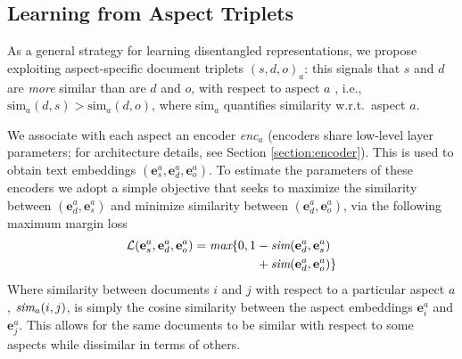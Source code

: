 \documentclass[11pt,a4paper]{article}
\begin{document}
\vspace{-.3em}
\subsection{Learning from Aspect Triplets}
\vspace{-.3em}

As a general strategy for learning disentangled representations, we propose exploiting aspect-specific document triplets $(s,d,o)_a$: this signals that $s$ and $d$ are \emph{more} similar than are $d$ and $o$, with respect to aspect $a$ \cite{karaletsos2015bayesian,veit2016conditional}, i.e., $\text{sim}_a (d, s) > \text{sim}_a (d, o)$, where sim$_a$ quantifies similarity w.r.t.~aspect $a$. 



We associate with each aspect an encoder \emph{enc}$_a$ (encoders share low-level layer parameters; for architecture details, see Section \ref{section:encoder}). This is used to obtain text embeddings $(\mathbf{e}^a_s, \mathbf{e}^a_d, \mathbf{e}^a_o)$. To estimate the parameters of these encoders we adopt a simple objective that seeks to maximize the similarity between $(\mathbf{e}^a_d, \mathbf{e}^a_s)$ and minimize similarity between $(\mathbf{e}^a_d, \mathbf{e}^a_o)$, via the following maximum margin loss%
\vspace{-.2em}
\begin{equation}
\begin{aligned}
\mathcal{L}(\mathbf{e}^a_s, \mathbf{e}^a_d, \mathbf{e}^a_o) = \text{\it max}\{0,  1 &- \text{\it sim}(\mathbf{e}^a_d, \mathbf{e}^a_s) \\&+ \text{\it sim}(\mathbf{e}^a_d, \mathbf{e}^a_o)\}
\end{aligned}
\end{equation}
\noindent Where similarity between documents $i$ and $j$ with respect to a particular aspect $a$,  $\text{\it sim}_a(i, j)$, is simply the cosine similarity between the aspect embeddings $\mathbf{e}^a_i$ and $\mathbf{e}^a_j$. This allows for the same documents to be similar with respect to some aspects while dissimilar in terms of others.
\end{document}
